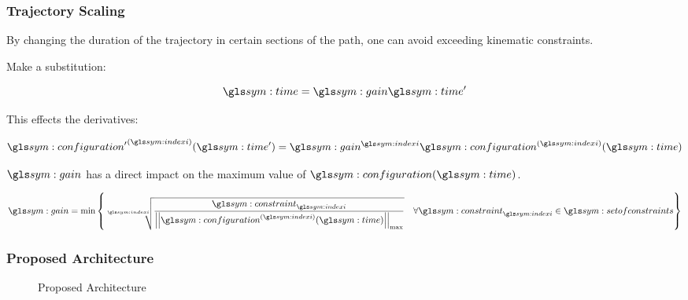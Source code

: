 \documentclass{beamer}
\begin{document}
	\begin{frame}
		\frametitle{Trajectory Scaling}

		By changing the duration of the trajectory in certain sections of the
		path, one can avoid exceeding kinematic constraints.


		Make a substitution:

		\begin{equation}
			\timesym = \gain\timesym'
			\label{eq:linear_time_scaling}
		\end{equation}

		This effects the derivatives:

		\begin{equation}
			\tdern{\configuration'}{\indexi}(\timesym') = \gain^{\indexi}
				\tdern{\configuration}{\indexi}(\timesym)
		\end{equation}

		$\gain$ has a direct impact on the maximum value of
		$\configuration(\timesym)$.

		\begin{equation}
			\gain = \min
				\left\{
					\sqrt[\indexi]
					{%
						\frac
						{%
							\constraint_{\indexi}
						}
						{%
								\norm
								{%
									\tdern{\configuration}{\indexi}(\timesym)
								}_{\max}
						}
					}
					\quad
					\forall \constraint_{\indexi} \in \setofconstraints
				\right\}
		\end{equation}


	\end{frame}


	\begin{frame}
		\frametitle{Proposed Architecture}
		\begin{figure}[hb]
			\centering
			\def\svgwidth{\columnwidth}
			\caption{Proposed Architecture}%
			\label{fig:proposed_architecture}
		\end{figure}
	\end{frame}
\end{document}
